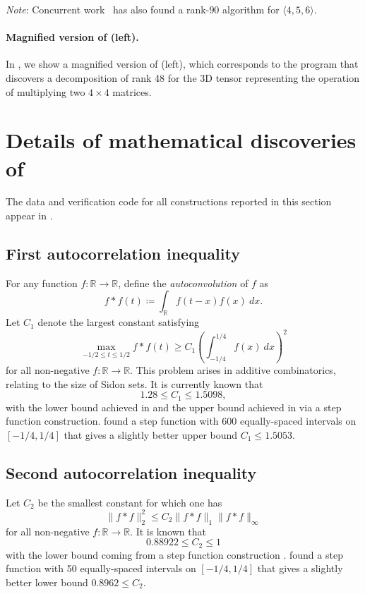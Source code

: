 \emph{Note}: Concurrent work~\cite{kauers2025consequences} has also found a rank-$90$ algorithm for $\langle 4, 5, 6 \rangle$.

\paragraph{Magnified version of  (left).} In , we show a magnified version of  (left), which corresponds to the program that discovers a decomposition of rank 48 for the 3D tensor representing the operation of multiplying two $4\times 4$ matrices. 



\clearpage
\section{Details of mathematical discoveries of \method}\label{app:maths}

The data and verification code for all constructions reported in this section appear in \ResultsColab.

\subsection{First autocorrelation inequality}
For any function $f: \mathbb{R} \rightarrow \mathbb{R}$, define the \emph{autoconvolution} of $f$ as $$f*f (t) \coloneqq \int_\mathbb{R} f(t-x) f(x)\ dx.$$
Let $C_1$ denote the largest constant satisfying
\begin{equation}\label{maxf}
 \max_{-1/2 \leq t \leq 1/2} f*f(t) \geq C_1 \left(\int_{-1/4}^{1/4} f(x)\ dx\right)^2
\end{equation}
for all non-negative $f: \mathbb{R} \rightarrow \mathbb{R}$.  This problem arises in additive combinatorics, relating to the size of Sidon sets.  It is currently known that
$$1.28 \leq C_1 \leq 1.5098,$$
with the lower bound achieved in \cite{cloninger2017suprema} and the upper bound achieved in \cite{matolcsi2010improved} via a step function construction.
\method found a step function with 600 equally-spaced intervals on $[-1/4,1/4]$ that gives a slightly better upper bound $C_1 \leq 1.5053$.

\subsection{Second autocorrelation inequality}
Let $C_2$ be the smallest constant for which one has
$$ \|f*f\|_2^2 \leq C_2 \|f*f\|_1 \|f*f\|_\infty$$
for all non-negative $f:\mathbb{R} \rightarrow \mathbb{R}$.
It is known that
$$ 0.88922 \leq C_2 \leq 1$$
with the lower bound coming from a step function construction \cite{matolcsi2010improved}. 
\method found a step function with 50 equally-spaced intervals on $[-1/4,1/4]$ that gives a slightly better lower bound $0.8962 \leq C_2$.

